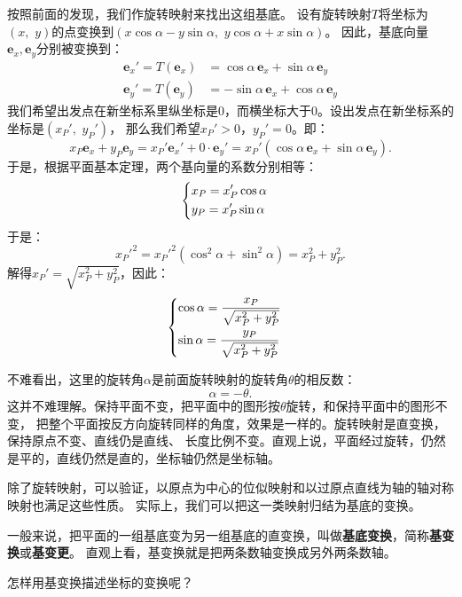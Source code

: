 \documentclass[12pt,UTF8]{ctexbook}
\begin{document}
按照前面的发现，我们作旋转映射来找出这组基底。
设有旋转映射$T$将坐标为$(x,\,\, y)$的点变换到$(x\cos{\alpha} - y\sin{\alpha},\,\,y\cos{\alpha} + x\sin{\alpha})$。
因此，基底向量$\mathbf{e}_x, \mathbf{e}_y$分别被变换到：
\begin{align*}
    \mathbf{e}_x' = T(\mathbf{e}_x) &= \cos{\alpha}\,\mathbf{e}_x + \sin{\alpha}\,\mathbf{e}_y  \\
    \mathbf{e}_y' = T(\mathbf{e}_y) &= -\sin{\alpha}\,\mathbf{e}_x + \cos{\alpha}\,\mathbf{e}_y  
\end{align*}
我们希望出发点在新坐标系里纵坐标是$0$，而横坐标大于$0$。设出发点在新坐标系的坐标是$(x_P', \,\, y_P')$，
那么我们希望$x_P' > 0$，$y_P' = 0$。即：
$$ x_P\mathbf{e}_x + y_P\mathbf{e}_y = x_P' \mathbf{e}_x' + 0 \cdot \mathbf{e}_y' = x_P' (\cos{\alpha}\,\mathbf{e}_x + \sin{\alpha}\,\mathbf{e}_y). $$
于是，根据平面基本定理，两个基向量的系数分别相等：
\begin{alignat*}{1}
&   \begin{dcases}
        x_P = x_P' \cos{\alpha} \\
        y_P = x_P' \sin{\alpha} 
    \end{dcases}
\end{alignat*}
于是：
$$ x_P'^2 = x_P'^2 (\cos^2{\alpha} + \sin^2{\alpha}) = x_P^2 + y_P^2. $$
解得$x_P' = \sqrt{x_P^2 + y_P^2}$，因此：
\begin{alignat*}{1}
&   \begin{dcases}
        \cos{\alpha} = \frac{x_P}{\sqrt{x_P^2 + y_P^2}} \\
        \sin{\alpha} = \frac{y_P}{\sqrt{x_P^2 + y_P^2}} 
    \end{dcases}
\end{alignat*}

不难看出，这里的旋转角$\alpha$是前面旋转映射的旋转角$\theta$的相反数：
$$ \alpha = -\theta.$$
这并不难理解。保持平面不变，把平面中的图形按$\theta$旋转，和保持平面中的图形不变，
把整个平面按反方向旋转同样的角度，效果是一样的。旋转映射是直变换，保持原点不变、直线仍是直线、
长度比例不变。直观上说，平面经过旋转，仍然是平的，直线仍然是直的，坐标轴仍然是坐标轴。

除了旋转映射，可以验证，以原点为中心的位似映射和以过原点直线为轴的轴对称映射也满足这些性质。
实际上，我们可以把这一类映射归结为基底的变换。

一般来说，把平面的一组基底变为另一组基底的直变换，叫做\textbf{基底变换}，简称\textbf{基变换}或\textbf{基变更}。
直观上看，基变换就是把两条数轴变换成另外两条数轴。

怎样用基变换描述坐标的变换呢？
\end{document}
